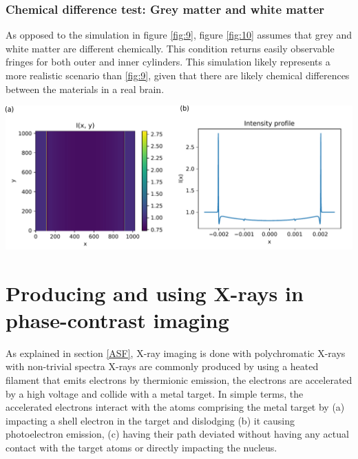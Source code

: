 \documentclass[10pt, a4paper, singlespacing]{report}
\newenvironment{Figure}
    {\par\medskip\noindent\minipage{\linewidth}}
    {\endminipage\par\medskip}
\begin{document}
\subsection{Chemical difference test: Grey matter and white matter}
As opposed to the simulation in figure \ref{fig:9}, figure \ref{fig:10} assumes that grey and white matter are different chemically. This condition returns  easily observable fringes for both outer and inner cylinders. This simulation likely represents a more realistic scenario than \ref{fig:9}, given that there are likely chemical differences between the materials in a real brain.
\begin{Figure}
\centering
\includegraphics[width=\linewidth]{optimistic_case.pdf}
\label{fig:10}
\end{Figure}

\chapter{Producing and using X-rays in phase-contrast imaging}\label{poly}
As explained in section \ref{ASF}, X-ray imaging is done with polychromatic X-rays with non-trivial spectra\cite{CH49}
X-rays are commonly produced by using a heated filament that emits electrons by thermionic emission, the electrons are accelerated by a high voltage and collide with a metal target. In simple terms, the accelerated electrons interact with the atoms comprising the metal target by (a) impacting a shell electron in the target and dislodging (b) it causing photoelectron emission, (c) having their path deviated without having any actual contact with the target atoms or directly impacting the nucleus.
\end{document}
